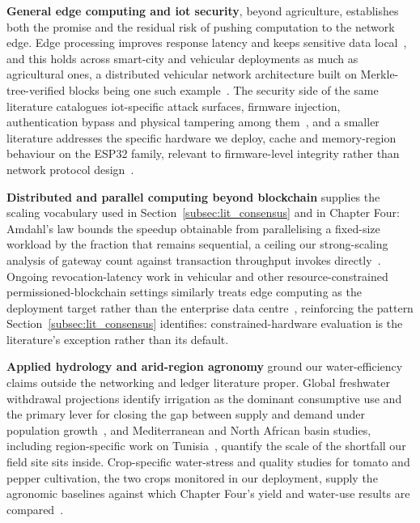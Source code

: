 \textbf{General edge computing and \gls{iot} security}, beyond agriculture,
establishes both the promise and the residual risk of pushing computation
to the network edge. Edge processing improves response latency and keeps
sensitive data local~\cite{sharma2020edge, liu2019edge, wang2021edge}, and
this holds across smart-city and vehicular deployments as much as
agricultural ones, a distributed vehicular network architecture built on
Merkle-tree-verified blocks being one such
example~\cite{sharma2018merkle}. The security side of the same literature
catalogues \gls{iot}-specific attack surfaces, firmware injection,
authentication bypass and physical tampering among
them~\cite{hassan2019iotSecurity, dorri2017blockchain, kalaimathi2025injection, akande2018iotChallenges, knight2025iotResilience, bashir2023IoTWear}, and a smaller literature addresses the specific
hardware we deploy, cache and memory-region behaviour on the
ESP32 family, relevant to firmware-level integrity rather than network
protocol design~\cite{kumari2025rom, csdn_esp32s3_cache, esp_hal_cache}.

\textbf{Distributed and parallel computing beyond blockchain} supplies the
scaling vocabulary used in Section~\ref{subsec:lit_consensus} and in
Chapter Four: Amdahl's law bounds the speedup obtainable from
parallelising a fixed-size workload by the fraction that remains
sequential, a ceiling our strong-scaling analysis of gateway
count against transaction throughput invokes
directly~\cite{amdahl1967validity}. Ongoing revocation-latency work in
vehicular and other resource-constrained permissioned-blockchain settings
similarly treats edge computing as the deployment target rather than the
enterprise data centre~\cite{lu2022revocation}, reinforcing the pattern
Section~\ref{subsec:lit_consensus} identifies: constrained-hardware
evaluation is the literature's exception rather than its default.

\textbf{Applied hydrology and arid-region agronomy} ground our
water-efficiency claims outside the networking and ledger literature
proper. Global freshwater withdrawal projections identify irrigation as
the dominant consumptive use and the primary lever for closing the gap
between supply and demand under
population growth~\cite{fao2050, un_water2023}, and Mediterranean and North
African basin studies, including region-specific work on
Tunisia~\cite{tunisia_water_report, adeloye2021tunisiaAgro, benali2024tunisiaWater}, quantify the scale of the
shortfall our field site sits inside. Crop-specific water-stress
and quality studies for tomato and pepper cultivation, the two crops
monitored in our deployment, supply the agronomic baselines
against which Chapter Four's yield and water-use results are
compared~\cite{mdpi_tunisia_tomato, jaeid_pepper, fao_tomato_guide, safeer2024tomato, wang2025pepper, tia2020waterstress, pepper2021moisturecontrol, capsicumspacing2017study, precision2020yield, pepperquality2019irrigation}.

